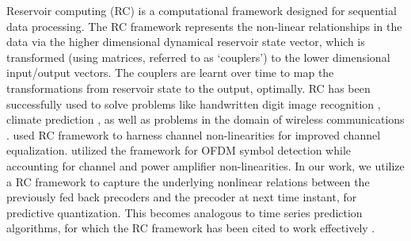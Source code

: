\documentclass[conference]{IEEEtran}
\begin{document}
{
Reservoir computing (RC) is a computational framework designed for sequential data processing.
The RC framework represents the non-linear relationships in the data via the higher dimensional dynamical reservoir state vector, which is transformed (using matrices, referred to as `couplers') to the lower dimensional input/output vectors. The couplers are learnt over time to map the transformations from reservoir state to the output, optimally.
RC has been successfully used to solve problems like handwritten digit image recognition \cite{jalalvand2015real}, climate prediction \cite{pathak2017using}, as well as problems in the domain of wireless communications \cite{jaeger2004harnessing,mosleh2017brain,shafin2018realizing}.
\cite{jaeger2004harnessing} used RC framework to harness channel non-linearities for improved channel equalization.
\cite{mosleh2017brain,shafin2018realizing} utilized the framework for OFDM symbol detection while accounting for channel and power amplifier non-linearities.
In our work, we utilize a RC framework to capture the underlying nonlinear relations between the previously fed back precoders and the precoder at next time instant, for predictive quantization. This becomes analogous to time series prediction algorithms, for which the RC framework has been cited to work effectively \cite{mosleh2017brain}.

\vspace{-1pt}
}
\end{document}
